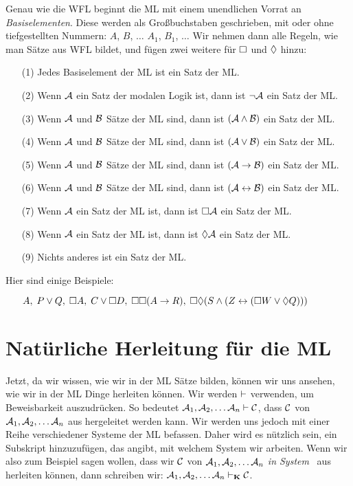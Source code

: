 Genau wie die WFL beginnt die ML mit einem unendlichen Vorrat an \emph{Basiselementen}. Diese werden als Gro{\ss}buchstaben geschrieben, mit oder ohne tiefgestellten Nummern: $A$, $B$, $\dots$ $A_1$, $B_1$, $\dots$ Wir nehmen dann alle Regeln, wie man Sätze aus WFL bildet, und fügen zwei weitere für $\Box$ und $\Diamond$ hinzu:
\begin{itemize}
	\item[(1)]Jedes Basiselement der ML ist ein Satz der ML.
	\item[(2)]Wenn $\mathcal{A}$ ein Satz der modalen Logik ist, dann ist $\neg\mathcal{A}$ ein Satz der ML.
	\item[(3)]Wenn $\mathcal{A}$ und $\mathcal{B}$ Sätze der ML sind, dann ist $(\mathcal{A}\wedge\mathcal{B})$ ein Satz der ML.
	\item[(4)]Wenn $\mathcal{A}$ und $\mathcal{B}$ Sätze der ML sind, dann ist $(\mathcal{A}\vee\mathcal{B})$ ein Satz der ML.
	\item[(5)]Wenn $\mathcal{A}$ und $\mathcal{B}$ Sätze der ML sind, dann ist $(\mathcal{A}\rightarrow\mathcal{B})$ ein Satz der ML.
	\item[(6)]Wenn $\mathcal{A}$ und $\mathcal{B}$ Sätze der ML sind, dann ist $(\mathcal{A}\leftrightarrow\mathcal{B})$ ein Satz der ML.
	\item[(7)]Wenn $\mathcal{A}$ ein Satz der ML ist, dann ist $\Box\mathcal{A}$ ein Satz der ML.
	\item[(8)]Wenn $\mathcal{A}$ ein Satz der ML ist, dann ist $\Diamond\mathcal{A}$ ein Satz der ML.
	\item[(9)]Nichts anderes ist ein Satz der ML.
\end{itemize}
Hier sind einige Beispiele:
\begin{itemize}
	\item[]$A,\;P\vee Q,\;\Box A,\;C\vee \Box D,\;\Box\Box (A\rightarrow R),\;\Box\Diamond (S\wedge (Z\leftrightarrow (\Box W \vee \Diamond Q)))$
\end{itemize}

\chapter{Natürliche Herleitung für die ML}
\label{Proof}

Jetzt, da wir wissen, wie wir in der ML Sätze bilden, können wir uns ansehen, wie wir in der ML Dinge herleiten können. Wir werden $\vdash$ verwenden, um Beweisbarkeit auszudrücken. So bedeutet $\mathcal{A}_1,\mathcal{A}_2, \dots \mathcal{A}_n \vdash \mathcal{C}$, dass $\mathcal{C}$ von $\mathcal{A}_1,\mathcal{A}_2, \dots \mathcal{A}_n$ aus hergeleitet werden kann. Wir werden uns jedoch mit einer Reihe verschiedener Systeme der ML befassen. Daher wird es nützlich sein, ein Subskript hinzuzufügen, das angibt, mit welchem System wir arbeiten. Wenn wir also zum Beispiel sagen wollen, dass wir $\mathcal{C}$ von $\mathcal{A}_1,\mathcal{A}_2, \dots \mathcal{A}_n$ \emph{in System}~\mlK{} aus herleiten können, dann schreiben wir: $\mathcal{A}_1,\mathcal{A}_2, \dots \mathcal{A}_n \vdash_{\mathbf{K}} \mathcal{C}$.

